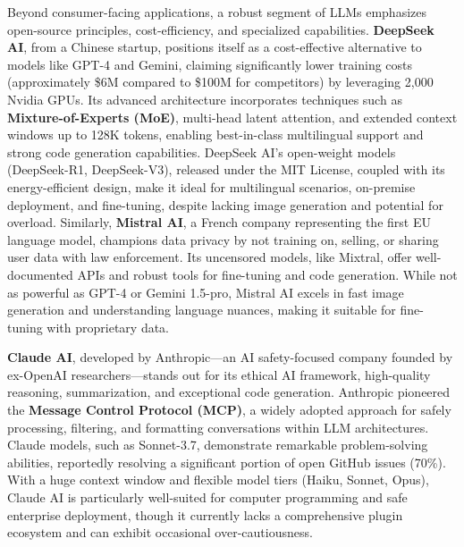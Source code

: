 \documentclass[a4paper, 12pt]{article}
\begin{document}
Beyond consumer-facing applications, a robust segment of LLMs emphasizes open-source principles, cost-efficiency, and specialized capabilities. \textbf{DeepSeek AI}, from a Chinese startup, positions itself as a cost-effective alternative to models like GPT-4 and Gemini, claiming significantly lower training costs (approximately \$6M compared to \$100M for competitors) by leveraging 2,000 Nvidia GPUs. Its advanced architecture incorporates techniques such as \textbf{Mixture-of-Experts (MoE)}, multi-head latent attention, and extended context windows up to 128K tokens, enabling best-in-class multilingual support and strong code generation capabilities. DeepSeek AI's open-weight models (DeepSeek-R1, DeepSeek-V3), released under the MIT License, coupled with its energy-efficient design, make it ideal for multilingual scenarios, on-premise deployment, and fine-tuning, despite lacking image generation and potential for overload. Similarly, \textbf{Mistral AI}, a French company representing the first EU language model, champions data privacy by not training on, selling, or sharing user data with law enforcement. Its uncensored models, like Mixtral, offer well-documented APIs and robust tools for fine-tuning and code generation. While not as powerful as GPT-4 or Gemini 1.5-pro, Mistral AI excels in fast image generation and understanding language nuances, making it suitable for fine-tuning with proprietary data.

\textbf{Claude AI}, developed by Anthropic—an AI safety-focused company founded by ex-OpenAI researchers—stands out for its ethical AI framework, high-quality reasoning, summarization, and exceptional code generation. Anthropic pioneered the \textbf{Message Control Protocol (MCP)}, a widely adopted approach for safely processing, filtering, and formatting conversations within LLM architectures. Claude models, such as Sonnet-3.7, demonstrate remarkable problem-solving abilities, reportedly resolving a significant portion of open GitHub issues (70\%). With a huge context window and flexible model tiers (Haiku, Sonnet, Opus), Claude AI is particularly well-suited for computer programming and safe enterprise deployment, though it currently lacks a comprehensive plugin ecosystem and can exhibit occasional over-cautiousness.
\end{document}
